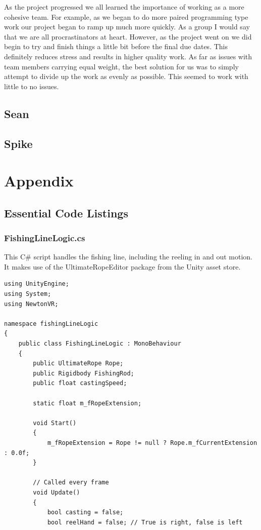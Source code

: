 \documentclass[10pt,journal,compsoc,onecolumn, draftclsnofoot]{IEEEtran}
\begin{document}
\begin{itemize}
As the project progressed we all learned the importance of working as a more cohesive team. For example, as we began to do more paired programming type work our project began to ramp up much more quickly. As a group I would say that we are all procrastinators at heart. However, as the project went on we did begin to try and finish things a little bit before the final due dates. This definitely reduces stress and results in higher quality work. As far as issues with team members carrying equal weight, the best solution for us was to simply attempt to divide up the work as evenly as possible. This seemed to work with little to no issues.

\subsection{Sean}

\subsection{Spike}

\clearpage
\section{Appendix}
\subsection{Essential Code Listings}
\subsubsection{FishingLineLogic.cs}
This C\# script handles the fishing line, including the reeling in and out motion. It makes use of the UltimateRopeEditor package from the Unity asset store. \\

\begin{verbatim}
using UnityEngine;
using System;
using NewtonVR;

namespace fishingLineLogic
{
    public class FishingLineLogic : MonoBehaviour
    {
        public UltimateRope Rope;
        public Rigidbody FishingRod;
        public float castingSpeed;

        static float m_fRopeExtension;

        void Start()
        {
            m_fRopeExtension = Rope != null ? Rope.m_fCurrentExtension : 0.0f;
        }

        // Called every frame
        void Update()
        {
            bool casting = false;
            bool reelHand = false; // True is right, false is left


\end{verbatim}
\end{itemize}
\end{document}
